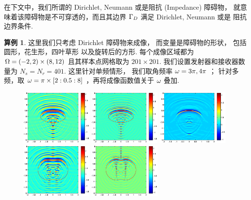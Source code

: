 {\bigskip

在下文中，我们所谓的 Dirichlet, Neumann 或是阻抗 (Impedance) 障碍物， 就意味着该障碍物是不可穿透的，而且其边界 $\Gamma_D$ 满足 Dirichlet, Neumann 或是 阻抗边界条件.


\bigskip
\textbf{算例 1}. 这里我们只考虑  Dirichlet 障碍物来成像， 而变量是障碍物的形状， 包括圆形，花生形，四叶草形 以及旋转后的方形. 每个成像区域都为 $\Omega=(-2,2) \times (8, 12)$ 且其样本点网格取为 $201 \times 201$. 我们设置发射器和接收器数量为 $N_s = N_r = 401$. 这里针对单频情形， 我们取角频率 $\omega = 3\pi,4\pi$ ； 针对多频，取 $\omega=\pi\times[2:0.5:8]$ ，再将成像函数值关于 $\omega$ 叠加.
\begin{figure}[htbp]
	\centering
	\includegraphics[width=0.32\textwidth]{./Img/graphic/circle_3pi.eps}
	\includegraphics[width=0.32\textwidth]{./Img/graphic/circle_5pi.eps}
	\includegraphics[width=0.32\textwidth]{./Img/graphic/circle.eps}
	\includegraphics[width=0.32\textwidth]{./Img/graphic/peanut_3pi.eps}
	\includegraphics[width=0.32\textwidth]{./Img/graphic/peanut_5pi.eps}

\end{figure}}
